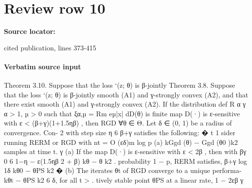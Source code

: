 \documentclass[10pt]{article}
\begin{document}
\section*{Review row 10}
\textbf{Source locator:} {\footnotesize\raggedright cited publication, lines 373-\allowbreak{}415\par}
\paragraph{Verbatim source input}
\begin{ReviewVerbatim}
Theorem 3.10. Suppose that the loss `(z; θ) is β-jointly
Theorem 3.8. Suppose that the loss `(z; θ) is β-jointly                       smooth (A1) and γ-strongly convex (A2), and that there exist
smooth (A1) and γ-strongly convex (A2). If the distribution                                                def R        α
                                        γ                                     α > 1, µ > 0 such that ξα,µ = Rm eµ|x| dD(θ) is ﬁnite
map D(·) is ε-sensitive with ε < (β+γ)(1+1.5ηβ) , then RGD
                                                                              ∀θ ∈ Θ. Let δ ∈ (0, 1) be a radius of convergence.     Con-
                     2
with step size η 6 β+γ satisﬁes the following:
                                                                                                                                    � t
                                                                                                                            1
                                                                              sider running RERM or RGD with nt = O (εδ)m log p
(a) kGgd (θ) − Ggd (θ0 )k2                                                    samples at time t.
                                                                                                                            γ
                                                                              (a) If the map D(·) is ε-sensitive with ε < 2β  , then with
                         βγ                                          0
      6       1−η           − ε(1.5ηβ 2 + β)             kθ − θ k2 .              probability 1 − p, RERM satisﬁes,
                        β+γ
                                                                                                                  log 1δ kθ0 − θPS k2
                                                                                                                     �
(b) The iterates θt of RGD converge to a unique performa-                           kθt − θPS k2 6 δ, for all t >                       .
    tively stable point θPS at a linear rate,                                                                           1 − 2εβ
                                                                                                                              γ


\end{ReviewVerbatim}
\end{document}
